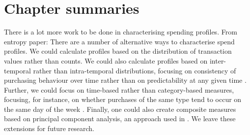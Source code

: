 
\section{Chapter summaries}%
\label{sec:chapter_summaries}



There is a lot more work to be done in characterising spending profiles. From
entropy paper: There are a number of alternative ways to characterise spend
profiles. We could calculate profiles based on the distribution of transaction
values rather than counts. We could also calculate profiles based on
inter-temporal rather than intra-temporal distributions, focusing on
consistency of purchasing behaviour over time rather than on predictability at
any given time \citep{krumme2013predictability}. Further, we could focus on
time-based rather than category-based measures, focusing, for instance, on
whether purchases of the same type tend to occur on the same day of the week
\citep{guidotti2015behavioral}. Finally, one could also create composite
measures based on principal component analysis, an approach used in
\citet{eagle2010network}. We leave these extensions for future research.

